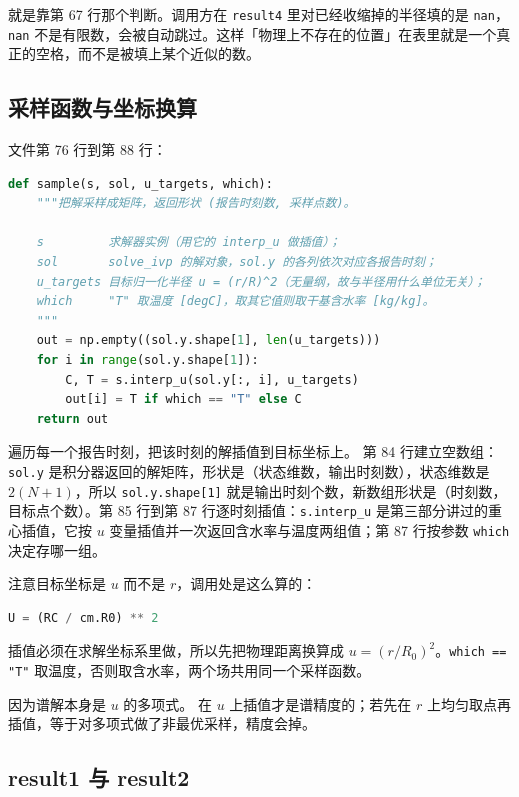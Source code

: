 就是靠第 67 行那个判断。调用方在 \texttt{result4} 里对已经收缩掉的半径填的是 \texttt{nan}，\texttt{nan} 不是有限数，会被自动跳过。这样「物理上不存在的位置」在表里就是一个真正的空格，而不是被填上某个近似的数。

\subsection{采样函数与坐标换算}

文件第 76 行到第 88 行：

\begin{lstlisting}[language=Python]
def sample(s, sol, u_targets, which):
    """把解采样成矩阵，返回形状 (报告时刻数, 采样点数)。

    s         求解器实例（用它的 interp_u 做插值）；
    sol       solve_ivp 的解对象，sol.y 的各列依次对应各报告时刻；
    u_targets 目标归一化半径 u = (r/R)^2（无量纲，故与半径用什么单位无关）；
    which     "T" 取温度 [degC]，取其它值则取干基含水率 [kg/kg]。
    """
    out = np.empty((sol.y.shape[1], len(u_targets)))
    for i in range(sol.y.shape[1]):
        C, T = s.interp_u(sol.y[:, i], u_targets)
        out[i] = T if which == "T" else C
    return out
\end{lstlisting}

遍历每一个报告时刻，把该时刻的解插值到目标坐标上。
第 84 行建立空数组：\texttt{sol.y} 是积分器返回的解矩阵，形状是（状态维数，输出时刻数），状态维数是 $2(N+1)$，所以 \texttt{sol.y.shape[1]} 就是输出时刻个数，新数组形状是（时刻数，目标点个数）。第 85 行到第 87 行逐时刻插值：\texttt{s.interp\_u} 是第三部分讲过的重心插值，它按 $u$ 变量插值并一次返回含水率与温度两组值；第 87 行按参数 \texttt{which} 决定存哪一组。

注意目标坐标是 $u$ 而不是 $r$，调用处是这么算的：

\begin{lstlisting}[language=Python]
U = (RC / cm.R0) ** 2
\end{lstlisting}

插值必须在求解坐标系里做，所以先把物理距离换算成 $u=(r/R_0)^2$。\texttt{which == "T"} 取温度，否则取含水率，两个场共用同一个采样函数。

因为谱解本身是 $u$ 的多项式。
在 $u$ 上插值才是谱精度的；若先在 $r$ 上均匀取点再插值，等于对多项式做了非最优采样，精度会掉。

\subsection{result1 与 result2}

